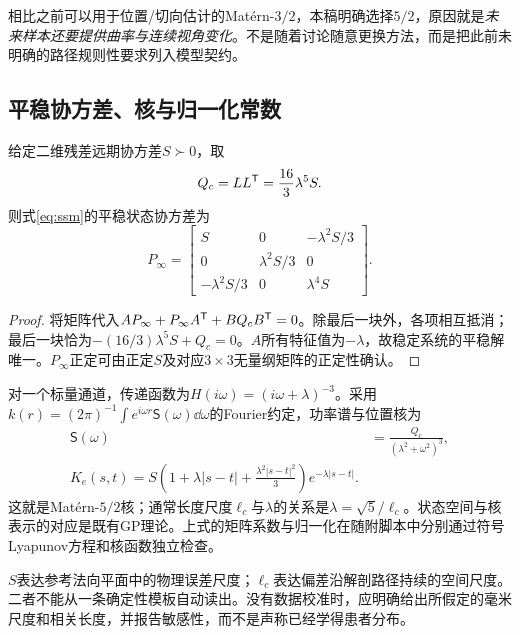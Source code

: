 \documentclass[UTF8,11pt,a4paper,fontset=fandol]{ctexart}
\numberwithin{equation}{section}
\theoremstyle{plain}
\theoremstyle{definition}
\theoremstyle{remark}
\begin{document}
相比之前可以用于位置/切向估计的Mat\'ern-$3/2$，本稿明确选择$5/2$，原因就是\emph{未来样本还要提供曲率与连续视角变化}。不是随着讨论随意更换方法，而是把此前未明确的路径规则性要求列入模型契约。

\subsection{平稳协方差、核与归一化常数}
给定二维残差远期协方差$S\succ0$，取
\begin{equation}
 Q_c=LL^{\mathsf T}=\frac{16}{3}\lambda^5 S.
 \label{eq:spectral-noise}
\end{equation}
则式\eqref{eq:ssm}的平稳状态协方差为
\begin{equation}
 \boxed{
 P_\infty=
 \begin{bmatrix}
 S&0&-\lambda^2S/3\\
 0&\lambda^2S/3&0\\
 -\lambda^2S/3&0&\lambda^4S
 \end{bmatrix}.}
 \label{eq:stationary-cov}
\end{equation}
\begin{proof}
将矩阵代入$AP_\infty+P_\infty A^{\mathsf T}+BQ_cB^{\mathsf T}=0$。除最后一块外，各项相互抵消；最后一块恰为$-(16/3)\lambda^5S+Q_c=0$。$A$所有特征值为$-\lambda$，故稳定系统的平稳解唯一。$P_\infty$正定可由正定$S$及对应$3\times3$无量纲矩阵的正定性确认。
\end{proof}

对一个标量通道，传递函数为$H(i\omega)=(i\omega+\lambda)^{-3}$。采用$k(r)=(2\pi)^{-1}\int e^{i\omega r}\mathsf S(\omega)\dd\omega$的Fourier约定，功率谱与位置核为
\begin{align}
 \mathsf S(\omega)&=\frac{Q_c}{(\lambda^2+\omega^2)^3},\\
 \boxed{K_e(s,t)=S\left(1+\lambda|s-t|+\frac{\lambda^2|s-t|^2}{3}\right)e^{-\lambda|s-t|}.}
 \label{eq:matern-kernel}
\end{align}
这就是Mat\'ern-$5/2$核；通常长度尺度$\ell_c$与$\lambda$的关系是$\lambda=\sqrt5/\ell_c$。状态空间与核表示的对应是既有GP理论\cite{Hartikainen2010,SarkkaSolin2019}。上式的矩阵系数与归一化在随附脚本中分别通过符号Lyapunov方程和核函数独立检查。

$S$表达参考法向平面中的物理误差尺度；$\ell_c$表达偏差沿解剖路径持续的空间尺度。二者不能从一条确定性模板自动读出。没有数据校准时，应明确给出所假定的毫米尺度和相关长度，并报告敏感性，而不是声称已经学得患者分布。
\end{document}
